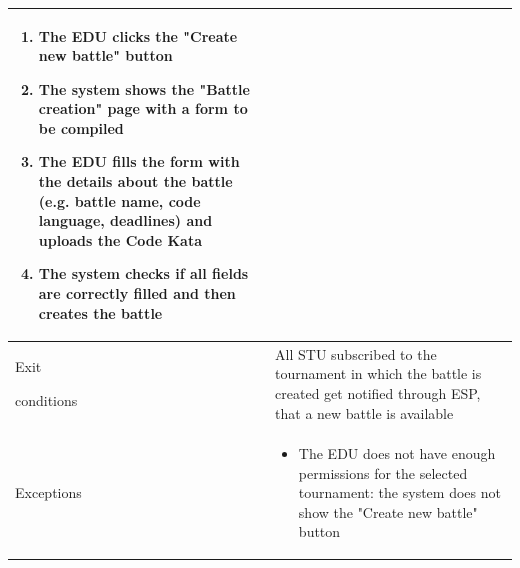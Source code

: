 \begin{center}
\begin{tabular}{| m{2cm} | m{10cm}|}
\begin{enumerate}
                                    \item The EDU clicks the "Create new battle" button
                                    \item The system shows the "Battle creation" page with a form to be compiled 
                                    \item The EDU fills the form with the details about the battle (e.g. battle name, code language, deadlines) and uploads the Code Kata
                                    \item The system checks if all fields are correctly filled and then creates the battle
                                \end{enumerate}                                                                                                                                                                     \\ \hline
        Exit \par conditions  & All STU subscribed to the tournament in which the battle is created get notified through ESP, that a new battle is available                                                        \\ \hline
        Exceptions            & \begin{itemize}
                                    \item The EDU does not have enough permissions for the selected tournament: the system does not show the "Create new battle" button
                                \end{itemize}                                                                                                                                                                       \\ \hline
    \end{tabular}
\end{center}


